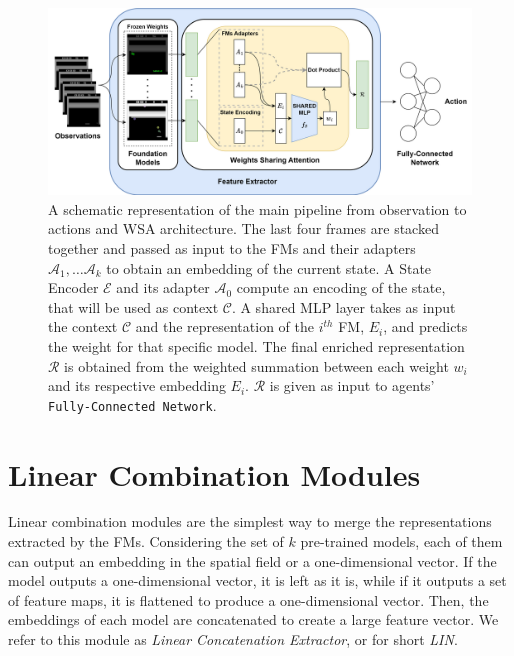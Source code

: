 \begin{figure}[ht]
    \begin{center}
        \includegraphics[width=1\textwidth]{images/main_architecture2}
    \end{center}
    \caption{A schematic representation of the main pipeline from observation to actions and WSA architecture. The last four frames are stacked together and passed as input to the FMs and their adapters $\mathcal{A}_1, \dots \mathcal{A}_k$ to obtain an embedding of the current state. A State Encoder $\mathcal{E}$ and its adapter $\mathcal{A}_0$ compute an encoding of the state, that will be used as context $\mathcal{C}$. A shared MLP layer takes as input the context $\mathcal{C}$ and the representation of the $i^{th}$ FM, $E_i$, and predicts the weight for that specific model. The final enriched representation $\mathcal{R}$ is obtained from the weighted summation between each weight $w_i$ and its respective embedding $E_i$. $\mathcal{R}$ is given as input to agents' \texttt{Fully-Connected Network}.}
    \label{fig:main_architecture}
\end{figure}

\section{Linear Combination Modules}
\label{sec:linear_combination}
Linear combination modules are the simplest way to merge the representations extracted by the FMs.
Considering the set of $k$ pre-trained models, each of them can output an embedding in the spatial field or a one-dimensional vector.
If the model outputs a one-dimensional vector, it is left as it is, while if it outputs a set of feature maps, it is flattened to produce a one-dimensional vector.
Then, the embeddings of each model are concatenated to create a large feature vector.
We refer to this module as \textit{Linear Concatenation Extractor}, or for short \textit{LIN}.


